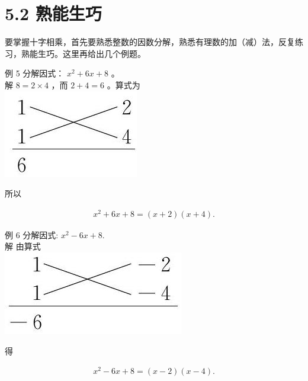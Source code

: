 \documentclass[10pt]{article}
\begin{document}
\section*{5.2 熟能生巧}
要掌握十字相乘，首先要熟悉整数的因数分解，熟悉有理数的加（减）法，反复练习，熟能生巧。这里再给出几个例题。

例 5 分解因式： $x^{2}+6 x+8$ 。\\
解 $8=2 \times 4$ ，而 $2+4=6$ 。算式为\\
\includegraphics[max width=\textwidth, center]{2024_10_30_bd799899fef40368a068g-036}

所以

\begin{align*}
x^{2}+6 x+8=(x+2)(x+4) .
\end{align*}

例 6 分解因式: $x^{2}-6 x+8$.\\
解 由算式\\
\includegraphics[max width=\textwidth, center]{2024_10_30_bd799899fef40368a068g-036(1)}

得

\begin{align*}
x^{2}-6 x+8=(x-2)(x-4) .
\end{align*}
\end{document}
